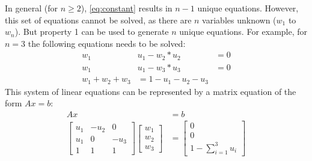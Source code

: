 \noindent
In general (for $n \geq 2$), \autoref{eq:constant} results in $n-1$ unique equations. However, this set of equations cannot be solved, as there are $n$ variables unknown ($w_1$ to $w_n$). But property 1 can be used to generate $n$ unique equations. For example, for $n=3$ the following equations needs to be solved:
\begin{equation}\label{eq:linear3}
\begin{split}
w_1 & u_1 - w_2 * u_2 &= 0 \\
w_1 & u_1 - w_3 * u_3 &= 0 \\
w_1 + w_2 + w_3 &= 1 - u_1 - u_2 - u_3
\end{split}
\end{equation}
This system of linear equations can be represented by a matrix equation of the form $Ax = b$:
\begin{equation} \label{eq:matrix}
\begin{split}
A x &= b\\
\begin{bmatrix}
u_1 & -u_2 & 0    \\
u_1 & 0    & -u_3 \\
1   & 1    & 1
\end{bmatrix}
\begin{bmatrix}
w_1 \\ w_2 \\ w_3
\end{bmatrix}
&= \begin{bmatrix}0 \\ 0 \\ 1 - \sum_{i=1}^3 u_i\end{bmatrix}
\end{split}
\end{equation}

